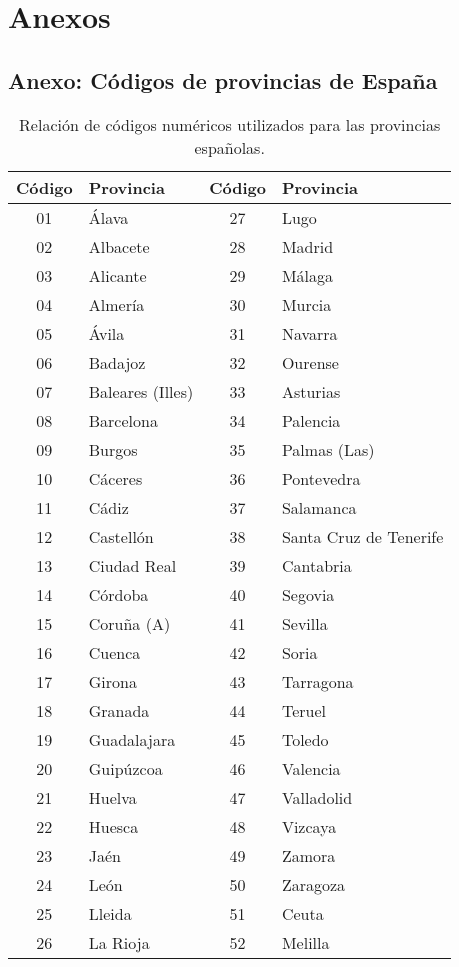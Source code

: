 \section{Anexos}
\small


\subsection{Anexo: Códigos de provincias de España}\label{sec:provincias}

\begin{table}[H]
\centering
\renewcommand{\arraystretch}{1.3}
\begin{tabular}{|c|l||c|l|}
\hline
\textbf{Código} & \textbf{Provincia} & \textbf{Código} & \textbf{Provincia} \\
\hline
01 & Álava             & 27 & Lugo \\
02 & Albacete          & 28 & Madrid \\
03 & Alicante          & 29 & Málaga \\
04 & Almería           & 30 & Murcia \\
05 & Ávila             & 31 & Navarra \\
06 & Badajoz           & 32 & Ourense \\
07 & Baleares (Illes)  & 33 & Asturias \\
08 & Barcelona         & 34 & Palencia \\
09 & Burgos            & 35 & Palmas (Las) \\
10 & Cáceres           & 36 & Pontevedra \\
11 & Cádiz             & 37 & Salamanca \\
12 & Castellón         & 38 & Santa Cruz de Tenerife \\
13 & Ciudad Real       & 39 & Cantabria \\
14 & Córdoba           & 40 & Segovia \\
15 & Coruña (A)        & 41 & Sevilla \\
16 & Cuenca            & 42 & Soria \\
17 & Girona            & 43 & Tarragona \\
18 & Granada           & 44 & Teruel \\
19 & Guadalajara       & 45 & Toledo \\
20 & Guipúzcoa         & 46 & Valencia \\
21 & Huelva            & 47 & Valladolid \\
22 & Huesca            & 48 & Vizcaya \\
23 & Jaén              & 49 & Zamora \\
24 & León              & 50 & Zaragoza \\
25 & Lleida            & 51 & Ceuta \\
26 & La Rioja          & 52 & Melilla \\
\hline
\end{tabular}
\caption{Relación de códigos numéricos utilizados para las provincias españolas.}
\label{anexo:provincias}
\end{table}


